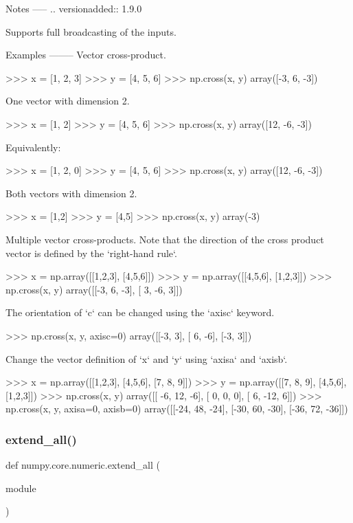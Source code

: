 \begin{DoxyVerb}
Notes
-----
.. versionadded:: 1.9.0

Supports full broadcasting of the inputs.

Examples
--------
Vector cross-product.

>>> x = [1, 2, 3]
>>> y = [4, 5, 6]
>>> np.cross(x, y)
array([-3,  6, -3])

One vector with dimension 2.

>>> x = [1, 2]
>>> y = [4, 5, 6]
>>> np.cross(x, y)
array([12, -6, -3])

Equivalently:

>>> x = [1, 2, 0]
>>> y = [4, 5, 6]
>>> np.cross(x, y)
array([12, -6, -3])

Both vectors with dimension 2.

>>> x = [1,2]
>>> y = [4,5]
>>> np.cross(x, y)
array(-3)

Multiple vector cross-products. Note that the direction of the cross
product vector is defined by the `right-hand rule`.

>>> x = np.array([[1,2,3], [4,5,6]])
>>> y = np.array([[4,5,6], [1,2,3]])
>>> np.cross(x, y)
array([[-3,  6, -3],
       [ 3, -6,  3]])

The orientation of `c` can be changed using the `axisc` keyword.

>>> np.cross(x, y, axisc=0)
array([[-3,  3],
       [ 6, -6],
       [-3,  3]])

Change the vector definition of `x` and `y` using `axisa` and `axisb`.

>>> x = np.array([[1,2,3], [4,5,6], [7, 8, 9]])
>>> y = np.array([[7, 8, 9], [4,5,6], [1,2,3]])
>>> np.cross(x, y)
array([[ -6,  12,  -6],
       [  0,   0,   0],
       [  6, -12,   6]])
>>> np.cross(x, y, axisa=0, axisb=0)
array([[-24,  48, -24],
       [-30,  60, -30],
       [-36,  72, -36]])\end{DoxyVerb}
 \mbox{\label{namespacenumpy_1_1core_1_1numeric_a3287732f6c508bbfb36d38dd66c81a78}} 
\subsubsection{\texorpdfstring{extend\+\_\+all()}{extend\_all()}}
{\footnotesize\ttfamily def numpy.\+core.\+numeric.\+extend\+\_\+all (\begin{DoxyParamCaption}\item[{}]{module }\end{DoxyParamCaption})}

